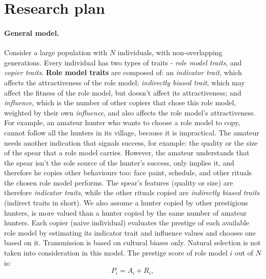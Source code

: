 \documentclass[11pt]{article}
\begin{document}
\section*{Research plan}
 \paragraph{General model.} Consider a large population with $N$ individuals, with non-overlapping generations. %
  Every individual has two types of traits - \textit{role model traits}, and \textit{copier traits}. %
    \textbf{Role model traits} are composed of: an \textit{indicator trait}, which affects the attractiveness of the role model; %
   \textit{indirectly biased trait}, which may affect the fitness of the role model, but doesn't affect its attractiveness; %
   and \textit{influence}, which is the number of other copiers that chose this role model, weighted by their own \textit{influence}, and also affects the role model's attractiveness. %
   For example, an amateur hunter who wants to choose a role model to copy, cannot follow all the hunters in its village, because it is impractical. %
   The amateur needs another indication that signals success, for example: the quality or the size of the spear that a role model carries. %
   However, the amateur understands that the spear isn't the sole source of the hunter's success, only implies it, and therefore he copies other behaviours too: face paint, schedule, and other rituals the chosen role model performs. %
   The spear's features (quality or size) are therefore \textit{indicator traits}, while the other rituals copied are \textit{indirectly biased traits} (indirect traits in short). %
   We also assume a hunter copied by other prestigious hunters, is more valued than a hunter copied by the same number of amateur hunters. %
   Each copier (naive individual) evaluates the prestige of each available role model by estimating its indicator trait and influence values and chooses one based on it.  %
   Transmission is based on cultural biases only. Natural selection is not taken into consideration in this model.
   The prestige score of role model $i$ out of $N$ is:
   \begin{equation}\label{naive prestige}
   	P_i = A_i + R_i,
   \end{equation}
\end{document}
